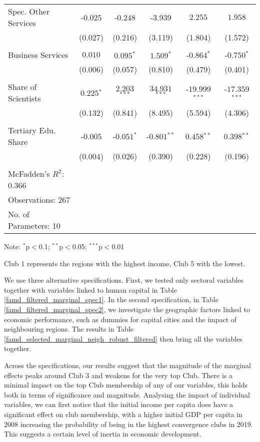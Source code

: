 \documentclass[11pt]{article}
\begin{document}
\begin{table}[!htbp]
{\begin{minipage}{\textwidth}
\begin{tabular}{@{\extracolsep{5pt}} lccccc}
Spec. Other Services & $ $-$0.025$ & $ $-$0.248$ & $ $-$3.939$ & $2.255$ & $1.958$ \\ 
& (0.027) &  (0.216) & (3.119) & (1.804) & (1.572)\\
&\\
Business Services & $0.010$ & $0.095$$^{*}$  & $1.509$$^{*}$  & $ $-$0.864$$^{*}$  & $ $-$0.750$$^{*}$  \\
& (0.006) &  (0.057) & (0.810) & (0.479) & (0.401)\\
&\\
Share of Scientists & $0.225$$^{*}$  & $2.203$$^{***}$  & $34.931$$^{***}$  & $ $-$19.999$$^{***}$  & $ $-$17.359$$^{***}$  \\ 
& (0.132) &  (0.841) & (8.495) & (5.594) & (4.306)\\
&\\
Tertiary Edu. Share & $ $-$0.005$ & $ $-$0.051$$^{*}$  & $ $-$0.801$$^{**}$  & $0.458$$^{**}$  & $0.398$$^{**}$  \\
& (0.004) &  (0.026) & (0.390) & (0.228) & (0.196)\\
\hline \hline \\[-1.8ex]
McFadden's $R^{2}$: 0.366 \\
Observations: 267\\
No. of Parameters: 10\\
\hline
\end{tabular}
\begin{tablenotes}
\small 
\item Note: $^{*}$p$<$0.1; $^{**}$p$<$0.05; $^{***}$p$<$0.01
\item Club 1 represents the regions with the highest income, Club 5 with the lowest.
\end{tablenotes}
\end{minipage}}
\end{table} 



We use three alternative specifications. First, we tested only sectoral variables together with variables linked to human capital in Table \ref{famd_filtered_marginal_spec1}. In the second specification, in Table \ref{famd_filtered_marginal_spec2},  we investigate the geographic factors linked to economic performance, such as dummies for capital cities and the impact of neighbouring regions. The results in Table \ref{famd_selected_marginal_neigh_robust_filtered} then bring all the variables together. 

Across the specifications, our results suggest that the magnitude of the marginal effects peaks around Club 3 and weakens for the very top Club. There is a minimal impact on the top Club membership of any of our variables, this holds both in terms of significance and magnitude. 
Analysing the impact of individual variables, we can first notice that the initial income per capita does have a significant effect on club membership, with a higher initial GDP per capita in 2008 increasing the probability of being in the highest convergence clubs in 2019. This suggests a certain level of inertia in economic development.
 
\end{document}
